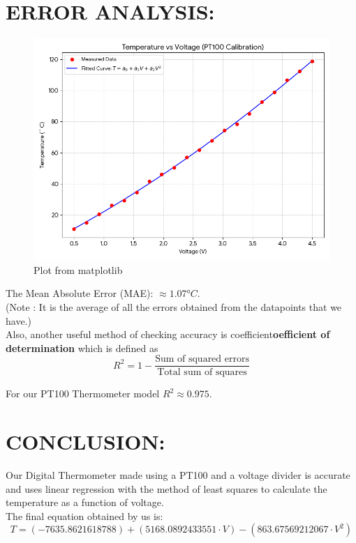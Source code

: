 \documentclass{article}
\begin{document}
\section{ERROR ANALYSIS:}

\begin{figure}[h]
    \centering
    \includegraphics[width=0.6
    \linewidth]{Code_Generated_Image.png}
    \caption{Plot from matplotlib}
\end{figure}

The Mean Absolute Error (MAE): $\approx 1.07 °C$.\\
(Note : It is the average of all the errors obtained from the datapoints that we have.)\\

Also, another useful method of checking accuracy is coefficient\textbf{oefficient of determination} which is defined as
\begin{equation}
    R^2 = 1 - \frac{\text{Sum of squared errors}}{\text{Total sum of squares}}
\end{equation}

For our PT100 Thermometer model $R^2 \approx 0.975$. 

\section{CONCLUSION:}
Our Digital Thermometer made using a PT100 and a voltage divider is accurate and uses linear regression with the method of least squares to calculate the temperature as a function of voltage. \\
The final equation obtained by us is:
\begin{equation}
    T = (-7635.8621618788) + (5168.0892433551\cdot V) - (863.67569212067 \cdot V^2)
\end{equation}
\end{document}
